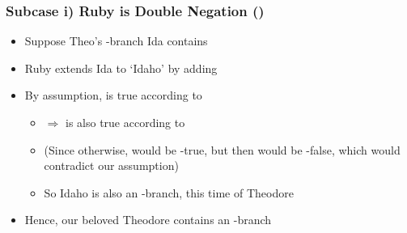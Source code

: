 \begin{frame}
\frametitle{Subcase i) Ruby is Double Negation (\enot)}

\begin{itemize}[<+->]

\item Suppose Theo's -branch Ida contains \enot\enot\PS

\item Ruby extends Ida to `Idaho' by adding \PS

\item By assumption, \enot\enot\PS is true according to 

\medskip

\begin{itemize}

\item[] $\Rightarrow$ \PS is also true according to 

\item (Since otherwise, \enot \PS would be -true, but then \enot\enot\PS would be -false, which would contradict our assumption)

\item So Idaho is also an -branch, this time of Theodore

\end{itemize}

\bigskip


\item Hence, our beloved Theodore contains an -branch



\end{itemize}
\end{frame}

